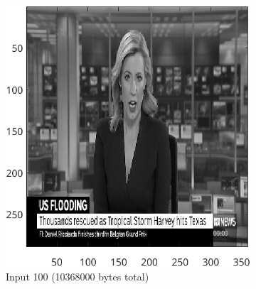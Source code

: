\documentclass{article}
\begin{document}
		\begin{figure}[ht]
		\centering
			\begin{subfigure}[t]{0.45\textwidth}
			\centering

			\includegraphics[width=\textwidth]{2B_Tolerance50Input}

			\caption{Input 100 (10368000 bytes total)}
			\label{fig:2B_Tolerance50Input}

		\end{subfigure}

			\begin{subfigure}[t]{0.45\textwidth}
			\centering


\end{subfigure}
\end{figure}
\end{document}
